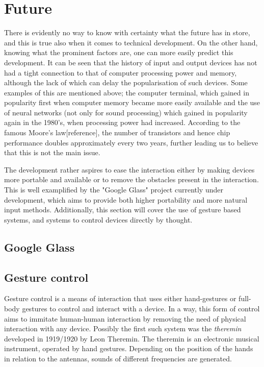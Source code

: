 
\section{Future}
There is evidently no way to know with certainty what the future has in store, and this is true also when it comes to technical development. On the other hand, knowing what the prominent factors are, one can more easily predict this development. It can be seen that the history of input and output devices has not had a tight connection to that of computer processing power and memory, although the lack of which can delay the popularisation of such devices. Some examples of this are mentioned above; the computer terminal, which gained in popularity first when computer memory became more easily available and the use of neural networks (not only for sound processing) which gained in popularity again in the 1980's, when processing power had increased. According to the famous Moore's law[reference], the number of transistors and hence chip performance doubles approximately every two years, further leading us to believe that this is not the main issue.

The development rather aspires to ease the interaction either by making devices more portable and available or to remove the obstacles present in the interaction. This is well examplified by the "Google Glass" project currently under development, which aims to provide both higher portability and more natural input methods. Additionally, this section will cover the use of gesture based systems, and systems to control devices directly by thought. 

\subsection{Google Glass}


\subsection{Gesture control}
Gesture control is a means of interaction that uses either hand-gestures or full-body gestures to control and interact with a device. In a way, this form of control aims to immitate human-human interaction by removing the need of physical interaction with any device. Possibly the first such system was the \emph{theremin} developed in 1919/1920 by Leon Theremin. The theremin is an electronic musical instrument, operated by hand gestures. Depending on the position of the hands in relation to the antennas, sounds of different frequencies are generated.

